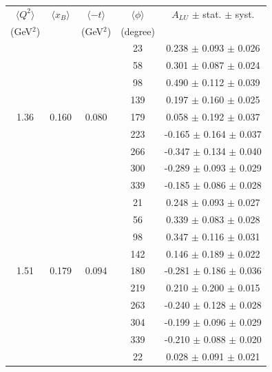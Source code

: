 \documentclass[aps,prc,preprint,superscriptaddress]{revtex4}
\begin{document}
\begin{table}[!h]
   \begin{center}
      \begin{tabular}{|c|c|c|c|c|}
         \hline
 $\langle Q^{2} \rangle$ & $\langle x_{B} \rangle$ & $\langle -t \rangle$ & $\langle \phi \rangle$ & $A_{LU}$ $\pm$ stat. $\pm$ syst.\\
 (GeV$^{2}$) &           & (GeV$^{2}$) & (degree) &  \\
  \hline
        &       &       &  23   &  0.238  $\pm$ 0.093  $\pm$ 0.026  \\
        &       &       &  58   &  0.301  $\pm$ 0.087  $\pm$ 0.024  \\
        &       &       &  98   &  0.490  $\pm$ 0.112  $\pm$ 0.039  \\
        &       &       & 139   &  0.197  $\pm$ 0.160  $\pm$ 0.025  \\
  1.36  & 0.160 & 0.080 & 179   &  0.058  $\pm$ 0.192  $\pm$ 0.037  \\
        &       &       & 223   & -0.165  $\pm$ 0.164  $\pm$ 0.037  \\
        &       &       & 266   & -0.347  $\pm$ 0.134  $\pm$ 0.040  \\
        &       &       & 300   & -0.289  $\pm$ 0.093  $\pm$ 0.029  \\
        &       &       & 339   & -0.185  $\pm$ 0.086  $\pm$ 0.028  \\
  \hline 
        &       &       &  21   &  0.248  $\pm$ 0.093  $\pm$ 0.027  \\ 
        &       &       &  56   &  0.339  $\pm$ 0.083  $\pm$ 0.028  \\ 
        &       &       &  98   &  0.347  $\pm$ 0.116  $\pm$ 0.031  \\ 
        &       &       & 142   &  0.146  $\pm$ 0.189  $\pm$ 0.022  \\ 
  1.51  & 0.179 & 0.094 & 180   & -0.281  $\pm$ 0.186  $\pm$ 0.036  \\ 
        &       &       & 219   &  0.210  $\pm$ 0.200  $\pm$ 0.015  \\ 
        &       &       & 263   & -0.240  $\pm$ 0.128  $\pm$ 0.028  \\ 
        &       &       & 304   & -0.199  $\pm$ 0.096  $\pm$ 0.029  \\ 
        &       &       & 339   & -0.210  $\pm$ 0.088  $\pm$ 0.020  \\ 
  \hline
        &       &       &  22   &  0.028  $\pm$ 0.091  $\pm$ 0.021  \\

\end{tabular}
\end{center}
\end{table}
\end{document}
